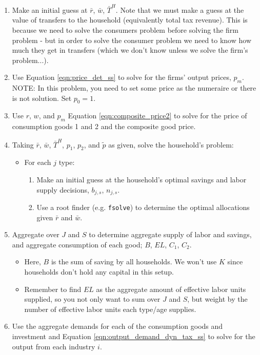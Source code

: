\documentclass[letterpaper,12pt]{article}
\theoremstyle{definition}
\begin{document}
\begin{spacing}{1.5}
\begin{enumerate}
\item Make an initial guess at $\bar{r}$, $\bar{w}$, $\bar{T}^{H}$.  Note that we must make a guess at the value of transfers to the household (equivalently total tax revenue).  This is because we need to solve the consumers problem before solving the firm problem - but in order to solve the consumer problem we need to know how much they get in transfers (which we don't know unless we solve the firm's problem...).
\item Use Equation \ref{eqn:price_det_ss} to solve for the firms' output prices, $p_{m}$.  NOTE: In this problem, you need to set some price as the numeraire or there is not solution.  Set $p_{0} = 1$.
\item Use $r$, $w$, and $p_{m}$ Equation \ref{eqn:composite_price2} to solve for the price of consumption goods 1 and 2 and the composite good price.
\item Taking $\bar{r}$, $\bar{w}$, $\bar{T}^{H}$, $p_{1}$, $p_{2}$, and $\tilde{p}$ as given, solve the household's problem:
	\begin{itemize}
	\item For each $j$ type:
		\begin{enumerate}
		\item Make an initial guess at the household's optimal savings and labor supply decisions, $b_{j,s}$, $n_{j,s}$.
		\item Use a root finder (e.g. \texttt{fsolve}) to determine the optimal allocations given $\bar{r}$ and $\bar{w}$.
		\end{enumerate}
	\end{itemize}
\item Aggregate over $J$ and $S$ to determine aggregate supply of labor and savings, and aggregate consumption of each good; $B$, $EL$, $C_{1}$, $C_{2}$.
	\begin{itemize}
	\item Here, $B$ is the sum of saving by all households.  We won't use $K$ since households don't hold any capital in this setup.
	\item Remember to find $EL$ as the aggregate amount of effective labor units supplied, so you not only want to sum over $J$ and $S$, but weight by the number of effective labor units each type/age supplies.
	\end{itemize}
\item Use the aggregate demands for each of the consumption goods and investment and Equation \ref{eqn:output_demand_dyn_tax_ss} to solve for the output from each industry $i$.

\end{enumerate}
\end{spacing}
\end{document}
